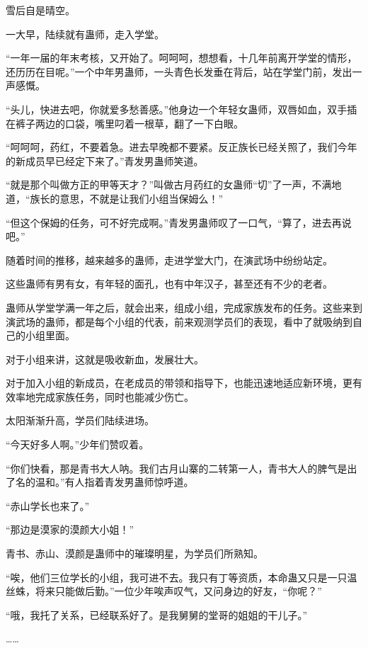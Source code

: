 
\begin{this_body}

雪后自是晴空。

一大早，陆续就有蛊师，走入学堂。

“一年一届的年末考核，又开始了。呵呵呵，想想看，十几年前离开学堂的情形，还历历在目呢。”一个中年男蛊师，一头青色长发垂在背后，站在学堂门前，发出一声感慨。

“头儿，快进去吧，你就爱多愁善感。”他身边一个年轻女蛊师，双唇如血，双手插在裤子两边的口袋，嘴里叼着一根草，翻了一下白眼。

“呵呵呵，药红，不要着急。进去早晚都不要紧。反正族长已经关照了，我们今年的新成员早已经定下来了。”青发男蛊师笑道。

“就是那个叫做方正的甲等天才？”叫做古月药红的女蛊师“切”了一声，不满地道，“族长的意思，不就是让我们小组当保姆么！”

“但这个保姆的任务，可不好完成啊。”青发男蛊师叹了一口气，“算了，进去再说吧。”

随着时间的推移，越来越多的蛊师，走进学堂大门，在演武场中纷纷站定。

这些蛊师有男有女，有年轻的面孔，也有中年汉子，甚至还有不少的老者。

蛊师从学堂学满一年之后，就会出来，组成小组，完成家族发布的任务。这些来到演武场的蛊师，都是每个小组的代表，前来观测学员们的表现，看中了就吸纳到自己的小组里面。

对于小组来讲，这就是吸收新血，发展壮大。

对于加入小组的新成员，在老成员的带领和指导下，也能迅速地适应新环境，更有效率地完成家族任务，同时也能减少伤亡。

太阳渐渐升高，学员们陆续进场。

“今天好多人啊。”少年们赞叹着。

“你们快看，那是青书大人呐。我们古月山寨的二转第一人，青书大人的脾气是出了名的温和。”有人指着青发男蛊师惊呼道。

“赤山学长也来了。”

“那边是漠家的漠颜大小姐！”

青书、赤山、漠颜是蛊师中的璀璨明星，为学员们所熟知。

“唉，他们三位学长的小组，我可进不去。我只有丁等资质，本命蛊又只是一只温丝蛛，将来只能做后勤。”一位少年唉声叹气，又问身边的好友，“你呢？”

“哦，我托了关系，已经联系好了。是我舅舅的堂哥的姐姐的干儿子。”

……


\end{this_body}
